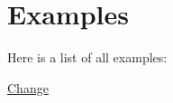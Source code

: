 \section{Examples}
Here is a list of all examples\+:\begin{DoxyCompactItemize}
\item 
\mbox{\hyperlink{Change-example}{Change}}
\end{DoxyCompactItemize}
